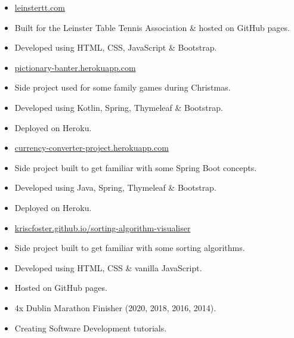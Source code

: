 

\begin{itemize}
\item \href{https://leinstertt.com}{leinstertt.com}
\item Built for the Leinster Table Tennis Association \& hosted on GitHub pages.
\item Developed using HTML, CSS, JavaScript \& Bootstrap.
\end{itemize}

\smallskip

\begin{itemize}
\item \href{https://pictionary-banter.herokuapp.com/}{pictionary-banter.herokuapp.com}
\item Side project used for some family games during Christmas.
\item Developed using Kotlin, Spring, Thymeleaf \& Bootstrap.
\item Deployed on Heroku.
\end{itemize}

\smallskip

\begin{itemize}
\item \href{https://currency-converter-project.herokuapp.com/}{currency-converter-project.herokuapp.com}
\item Side project built to get familiar with some Spring Boot concepts.
\item Developed using Java, Spring, Thymeleaf \& Bootstrap.
\item Deployed on Heroku.
\end{itemize}

\smallskip

\begin{itemize}
\item \href{https://kriscfoster.github.io/sorting-algorithm-visualiser/}{kriscfoster.github.io/sorting-algorithm-visualiser}
\item Side project built to get familiar with some sorting algorithms.
\item Developed using HTML, CSS \& vanilla JavaScript.
\item Hosted on GitHub pages.
\end{itemize}

\begin{itemize}
\item 4x Dublin Marathon Finisher (2020, 2018, 2016, 2014).
\item Creating Software Development tutorials.

\end{itemize}
